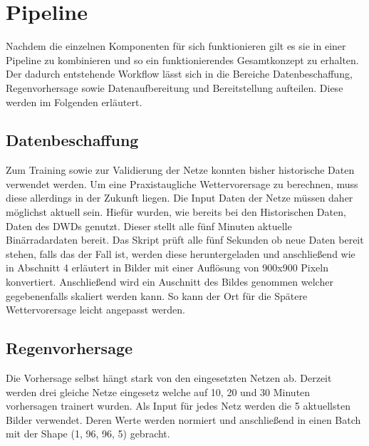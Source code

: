 \section{Pipeline}
Nachdem die einzelnen Komponenten für sich funktionieren gilt es sie in einer Pipeline zu kombinieren und so ein funktionierendes Gesamtkonzept zu erhalten.
Der dadurch entstehende Workflow lässt sich in die Bereiche Datenbeschaffung, Regenvorhersage sowie Datenaufbereitung und Bereitstellung aufteilen.
Diese werden im Folgenden erläutert.

\subsection{Datenbeschaffung}
Zum Training sowie zur Validierung der Netze konnten bisher historische Daten verwendet werden.
Um eine Praxistaugliche Wettervorersage zu berechnen, muss diese allerdings in der Zukunft liegen.
Die Input Daten der Netze müssen daher möglichst aktuell sein.
Hiefür wurden, wie bereits bei den Historischen Daten, Daten des DWDs genutzt.
Dieser stellt alle fünf Minuten aktuelle Binärradardaten bereit.
Das Skript prüft alle fünf Sekunden ob neue Daten bereit stehen, falls das der Fall ist, werden diese heruntergeladen und anschließend wie in Abschnitt 4 erläutert in Bilder mit einer Auflösung von 900x900 Pixeln konvertiert.
Anschließend wird ein Auschnitt des Bildes genommen welcher gegebenenfalls skaliert werden kann.
So kann der Ort für die Spätere Wettervorersage leicht angepasst werden.

\subsection{Regenvorhersage}
Die Vorhersage selbst hängt stark von den eingesetzten Netzen ab.
Derzeit werden drei gleiche Netze eingesetz welche auf 10, 20 und 30 Minuten vorhersagen trainert wurden.
Als Input für jedes Netz werden die 5 aktuellsten Bilder verwendet.
Deren Werte werden normiert und anschließend in einen Batch mit der Shape (1, 96, 96, 5) gebracht.

